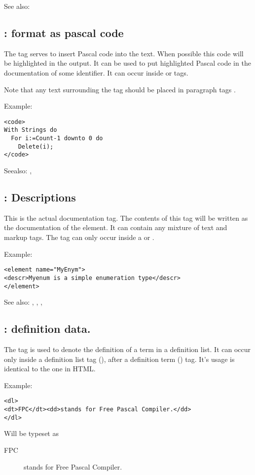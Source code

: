 See also: 

\subsection{ : format as pascal code}
\label{tag:code}
The  tag serves to insert Pascal code into the text. When possible
this code will be highlighted in the output. It can be used to put
highlighted Pascal code in the documentation of some identifier. It can
occur inside  or  tags.

Note that any text surrounding the  tag should be placed in
paragraph tags .

Example:
\begin{verbatim}
<code>
With Strings do
  For i:=Count-1 downto 0 do
    Delete(i);
</code>
\end{verbatim}

Seealso: , 

\subsection{ : Descriptions}
\label{tag:descr}
This is the actual documentation tag. The contents of this tag will be 
written as the documentation of the element. It can contain any mixture of
text and markup tags. The  tag can only occur inside a
 or .

Example:
\begin{verbatim}
<element name="MyEnym">
<descr>Myenum is a simple enumeration type</descr>
</element>
\end{verbatim}

See also: , , , 

\subsection{ : definition data.}
\label{tag:dd}
The  tag is used to denote the definition of a term in a definition
list. It can occur only inside a definition list tag (), after a
definition term () tag. It's usage is identical to the one in HTML.

Example:
\begin{verbatim}
<dl>
<dt>FPC</dt><dd>stands for Free Pascal Compiler.</dd>
</dl>
\end{verbatim}
Will be typeset as
\begin{description}
\item[FPC] stands for Free Pascal Compiler.
\end{description}

